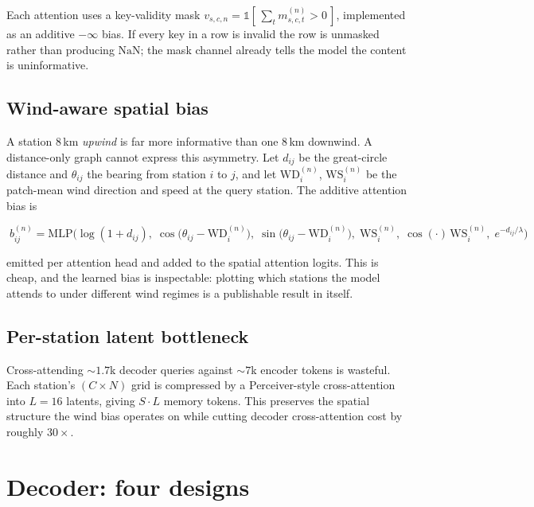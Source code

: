 \documentclass[11pt,a4paper]{article}
\begin{document}
Each attention uses a key-validity mask $v_{s,c,n}=\mathbb{1}[\,\sum_t m^{(n)}_{s,c,t}>0\,]$,
implemented as an additive $-\infty$ bias. If every key in a row is invalid the
row is unmasked rather than producing $\mathrm{NaN}$; the mask channel already
tells the model the content is uninformative.

\subsection{Wind-aware spatial bias}

A station 8\,km \emph{upwind} is far more informative than one 8\,km downwind. A
distance-only graph cannot express this asymmetry. Let $d_{ij}$ be the
great-circle distance and $\theta_{ij}$ the bearing from station $i$ to $j$, and
let $\mathrm{WD}_i^{(n)}$, $\mathrm{WS}_i^{(n)}$ be the patch-mean wind direction
and speed at the query station. The additive attention bias is

\begin{equation}
\boxed{\;
b^{(n)}_{ij} = \mathrm{MLP}\Big(
\log(1+d_{ij}),\;
\cos\big(\theta_{ij}-\mathrm{WD}_i^{(n)}\big),\;
\sin\big(\theta_{ij}-\mathrm{WD}_i^{(n)}\big),\;
\mathrm{WS}_i^{(n)},\;
\cos(\cdot)\,\mathrm{WS}_i^{(n)},\;
e^{-d_{ij}/\lambda}
\Big)\;}
\end{equation}

emitted per attention head and added to the spatial attention logits. This is
cheap, and the learned bias is inspectable: plotting which stations the model
attends to under different wind regimes is a publishable result in itself.

\subsection{Per-station latent bottleneck}

Cross-attending $\sim\!1.7$k decoder queries against $\sim\!7$k encoder tokens is
wasteful. Each station's $(C\times N)$ grid is compressed by a Perceiver-style
cross-attention into $L=16$ latents, giving $S\!\cdot\!L$ memory tokens. This
preserves the spatial structure the wind bias operates on while cutting decoder
cross-attention cost by roughly $30\times$.

\section{Decoder: four designs}
\label{sec:decoders}
\end{document}

